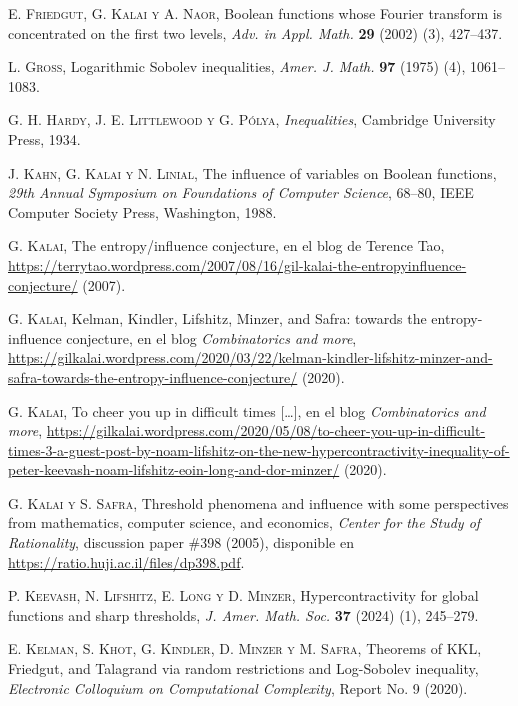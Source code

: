 \documentclass[autocontact]{gaceta}
\begin{document}
\begin{thebibliography}{09}
\textsc{E. Friedgut, G. Kalai y A. Naor},
Boolean functions whose Fourier transform is concentrated on the first two levels,
\textit{Adv. in Appl. Math.} \textbf{29} (2002) (3), 427--437.

\textsc{L. Gross},
Logarithmic Sobolev inequalities,
\textit{Amer. J. Math.} \textbf{97} (1975) (4), 1061--1083.

\textsc{G. H. Hardy, J. E. Littlewood y G. Pólya},
\textit{Inequalities},
Cambridge University Press, 1934.

\textsc{J. Kahn, G. Kalai y N. Linial},
The influence of variables on Boolean functions,
\textit{29th Annual Symposium on Foundations of Computer Science}, 68--80,
IEEE Computer Society Press, Washington, 1988.

\textsc{G. Kalai},
The entropy/influence conjecture,
en el blog de Terence Tao, \url{https://terrytao.wordpress.com/2007/08/16/gil-kalai-the-entropyinfluence-conjecture/} (2007).

\textsc{G. Kalai},
Kelman, Kindler, Lifshitz, Minzer, and Safra: towards the entropy-influence conjecture,
en el blog \emph{Combinatorics and more},
\url{https://gilkalai.wordpress.com/2020/03/22/kelman-kindler-lifshitz-minzer-and-safra-towards-the-entropy-influence-conjecture/} (2020).

\textsc{G. Kalai},
To cheer you up in difficult times [\dots],
en el blog \emph{Combinatorics and more},
\url{https://gilkalai.wordpress.com/2020/05/08/to-cheer-you-up-in-difficult-times-3-a-guest-post-by-noam-lifshitz-on-the-new-hypercontractivity-inequality-of-peter-keevash-noam-lifshitz-eoin-long-and-dor-minzer/} (2020).

\textsc{G. Kalai y S. Safra},
Threshold phenomena and influence with some perspectives from mathematics, computer science, and economics,
\textit{Center for the Study of Rationality}, discussion paper \#398 (2005),
disponible en \url{https://ratio.huji.ac.il/files/dp398.pdf}.

\textsc{P. Keevash, N. Lifshitz, E. Long y D. Minzer},
Hypercontractivity for global functions and sharp thresholds,
\textit{J. Amer. Math. Soc.} \textbf{37} (2024) (1), 245--279.

\textsc{E. Kelman, S. Khot, G. Kindler, D. Minzer y M. Safra},
Theorems of KKL, Friedgut, and Talagrand via random restrictions and Log-Sobolev inequality,
\textit{Electronic Colloquium on Computational Complexity}, Report No. 9 (2020).


\end{thebibliography}
\end{document}
